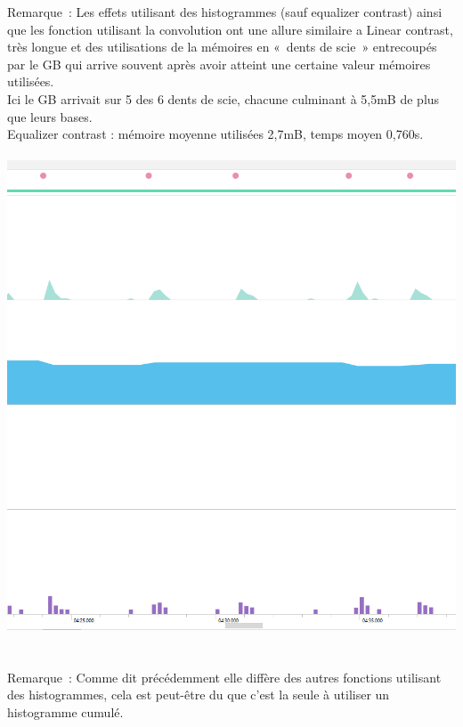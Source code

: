 \documentclass[12pt]{article}
\begin{document}
    Remarque : 
    Les effets utilisant des histogrammes (sauf equalizer contrast) ainsi que les fonction utilisant la convolution ont une allure similaire a Linear contrast, très longue et des utilisations de la mémoires en « dents de scie » entrecoupés par le GB qui arrive souvent après avoir atteint une certaine valeur mémoires utilisées.\\
    Ici le GB arrivait sur 5 des 6 dents de scie, chacune culminant à 5,5mB de plus que leurs bases.\\


    Equalizer contrast : mémoire moyenne utilisées 2,7mB, temps moyen 0,760s.\\




\\

    \includegraphics{egalisateur}
    \\
\\
\\


    Remarque :
    Comme dit précédemment elle diffère des autres fonctions utilisant des histogrammes, cela est peut-être du que c'est la seule à utiliser un histogramme cumulé.\\
\end{document}
